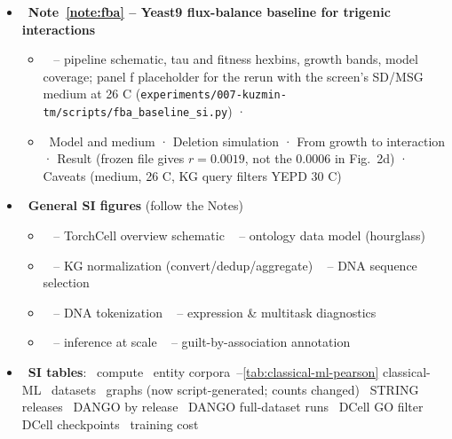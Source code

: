 \begin{itemize}
  \item {}\ \textbf{Note~\ref{note:fba} -- Yeast9 flux-balance baseline for trigenic interactions}
    \begin{itemize}\setlength{\itemsep}{0pt}
      \item {}\  -- pipeline schematic, tau and fitness hexbins, growth bands, model coverage; panel f placeholder for the rerun with the screen's SD/MSG medium at 26 C (\texttt{experiments/007-kuzmin-tm/scripts/fba\_baseline\_si.py}) · 
      \item {}\ Model and medium · Deletion simulation · From growth to interaction · Result (frozen file gives $r=0.0019$, not the 0.0006 in Fig.~2d) · Caveats (medium, 26 C, KG query filters YEPD 30 C)
    \end{itemize}

  \item {}\ \textbf{General SI figures} (follow the Notes)
    \begin{itemize}\setlength{\itemsep}{0pt}
      \item {}\  -- TorchCell overview schematic \quad {}\  -- ontology data model (hourglass)
      \item {}\  -- KG normalization (convert/dedup/aggregate) \quad {}\  -- DNA sequence selection
      \item {}\  -- DNA tokenization \quad {}\  -- expression \& multitask diagnostics
      \item {}\  -- inference at scale \quad {}\  -- guilt-by-association annotation
    \end{itemize}
  \item {}\ \textbf{SI tables}: \, compute \quad {}\, entity corpora \quad {}\,--\ref{tab:classical-ml-pearson} classical-ML \quad {}\, datasets \quad {}\, graphs (now script-generated; counts changed) \quad {}\, STRING releases \quad {}\, DANGO by release \quad {}\, DANGO full-dataset runs \quad {}\, DCell GO filter \quad {}\, DCell checkpoints \quad {}\, training cost
\end{itemize}
\endgroup
